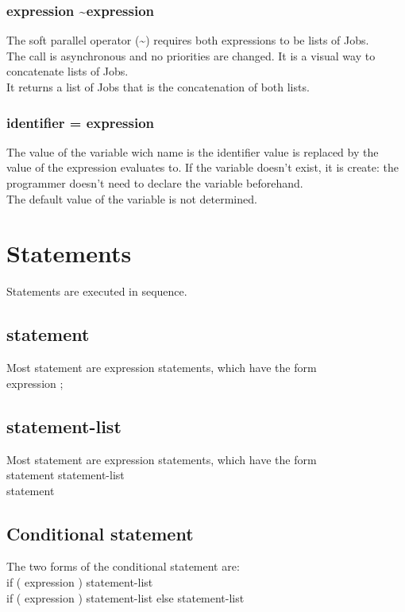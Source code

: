 \documentclass[12pt]{article}
\begin{document}
\subsubsection{expression \textasciitilde expression}
The soft parallel operator (\textasciitilde) requires both expressions to be lists of Jobs.\\
The call is asynchronous and no priorities are changed. It is a visual way to
concatenate lists of Jobs.\\
It returns a list of Jobs that is the concatenation of both lists.

\subsubsection{identifier = expression}
The value of the variable wich name is the identifier value is replaced by the value of the expression
evaluates to. If the variable doesn't exist, it is create: the programmer doesn't need to declare the
variable beforehand.\\
The default value of the variable is not determined.

\section{Statements}
Statements are executed in sequence.

\subsection{statement}
Most statement are expression statements, which have the form\\
expression ;

\subsection{statement-list}
Most statement are expression statements, which have the form\\
statement statement-list\\
statement

\subsection{Conditional statement}
The two forms of the conditional statement are:\\
if ( expression ) { statement-list }\\
if ( expression ) { statement-list } else { statement-list }\\
\end{document}
